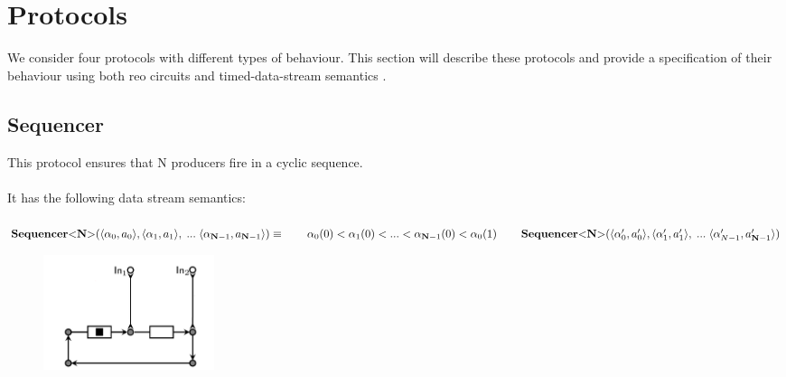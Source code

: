 \section{Protocols} \label{sec:protocols}
We consider four protocols with different types of behaviour. This section will describe these protocols and provide a specification of their behaviour using both reo circuits \cite{puff} and timed-data-stream semantics \cite{datastream}.

\subsection{Sequencer}%
  This protocol ensures that N producers fire in a cyclic sequence.\\\\
  It has the following data stream semantics:\\\\
  $
  \vspace{0.2cm}\sequencer (\langle \alpha_0, a_0 \rangle, \langle \alpha_1, a_1 \rangle,\;...\; \langle \alpha_{\textbf{N}-1}, a_{\textbf{N}-1} \rangle) \equiv \\
  \vspace{0.2cm}\hphantom \qquad  \alpha_0(0) < \alpha_1(0) < ... < \alpha_{\textbf{N}-1}(0) < \alpha_0(1) \\
  \hphantom \qquad \sequencer(\langle \alpha_0', a_0' \rangle, \langle \alpha_1', a_1' \rangle,\;...\; \langle \alpha_{N-1}', a_{\textbf{N}-1}' \rangle)
  $
  \begin{figure}[H]
      \begin{center}
  \includegraphics[width=5cm]{img/seq.png}
\end{center}
  \end{figure}

